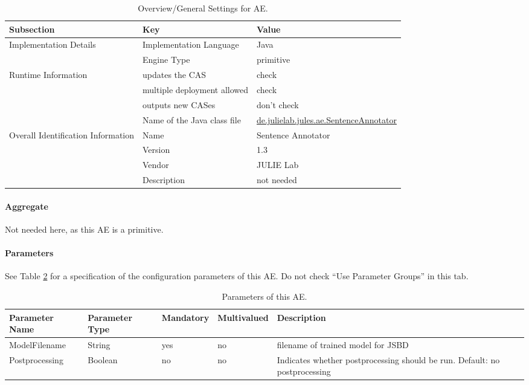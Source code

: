 \documentclass[11pt,a4paper,halfparskip]{scrartcl}
\begin{document}
\begin{table}[h!]
  \centering
  \begin{tabular}{|p{3.5cm}|p{4cm}|p{6cm}|}
    \hline
    Subsection & Key & Value \\
    \hline\hline
    Implementation Details & Implementation Language & Java \\
    \cline{2-3}
    & Engine Type & primitive \\
    \hline
    Runtime Information & updates the CAS & check \\
    \cline{2-3}
    & multiple deployment allowed & check \\
    \cline{2-3}
    & outputs new CASes &  don't check \\
    \cline{2-3}
    & Name of the Java class file & \url{de.julielab.jules.ae.SentenceAnnotator}\\
    \hline
    Overall Identification Information & Name &  Sentence Annotator \\
    \cline{2-3}
    & Version &  1.3 \\
    \cline{2-3}
    & Vendor & JULIE Lab\\
    \cline{2-3}
    & Description & not needed\\
    \hline
  \end{tabular}
  \caption{Overview/General Settings for AE.}
  \label{tab:overview}
\end{table}


\paragraph{Aggregate}
Not needed here, as this AE is a primitive.

\paragraph{Parameters}
\label{sss:parameters}

See Table \ref{tab:parameters} for a specification of the
configuration parameters of this AE. Do not check ``Use Parameter
Groups'' in this tab.

\begin{table}[h!]
  \centering
  \begin{tabular}{|p{4cm}|p{2cm}|p{2cm}|p{2cm}|p{4cm}|}
    \hline
    Parameter Name & Parameter Type & Mandatory & Multivalued & Description \\
    \hline\hline
    ModelFilename & String & yes & no & filename of trained model for
    JSBD\\
    \hline
    Postprocessing & Boolean & no & no & Indicates whether postprocessing should be run. Default: no postprocessing\\
    \hline
  \end{tabular}
  \caption{Parameters of this AE.}
  \label{tab:parameters}
\end{table}
\end{document}

